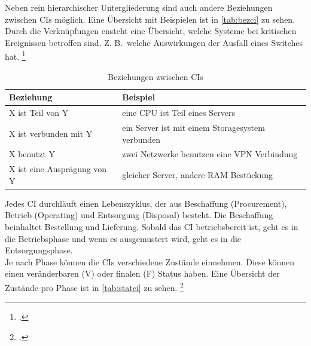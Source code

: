 Neben rein hierarchischer Untergliederung sind auch andere Beziehungen zwischen \acsp{CI} möglich. Eine Übersicht mit Beispielen ist in \autoref{tab:bezci} zu sehen.\\
Durch die Verknüpfungen ensteht eine Übersicht, welche Systeme bei kritischen Ereignissen betroffen sind. Z. B.~welche Auswirkungen der Ausfall eines Switches hat.
\footcite[Vgl.][74\psq]{Olbrich_2008_ITIL}

\begin{table}[H]
\centering
\begin{tabularx}{0.8\textwidth}{l|X}
                            Beziehung & Beispiel \\\hline
                            X ist Teil von Y & eine CPU ist Teil eines Servers\\
                            X ist verbunden mit Y & ein Server ist mit einem Storagesystem verbunden \\
                            X benutzt Y & zwei Netzwerke benutzen eine VPN Verbindung \\
                            X ist eine Ausprägung von Y & gleicher Server, andere RAM Bestückung \\
\end{tabularx}
\caption{Beziehungen zwischen \aclp{CI}}
\label{tab:bezci}
\end{table}



Jedes \acs{CI} durchläuft einen Lebenszyklus, der aus Beschaffung (Procurement), Betrieb (Operating) und Entsorgung (Disposal) besteht.
Die Beschaffung beinhaltet Bestellung und Lieferung. Sobald das \acs{CI} betriebsbereit ist, geht es in die Betriebsphase und wenn es ausgemustert wird, geht es in die Entsorgungsphase.\\
Je nach Phase können die \acsp{CI} verschiedene Zustände einnehmen. Diese können einen veränderbaren (V) oder finalen (F) Status haben. Eine Übersicht der Zustände pro Phase ist in \autoref{tab:statci} zu sehen.
\footcite[Vgl.][76\psq]{Olbrich_2008_ITIL}


